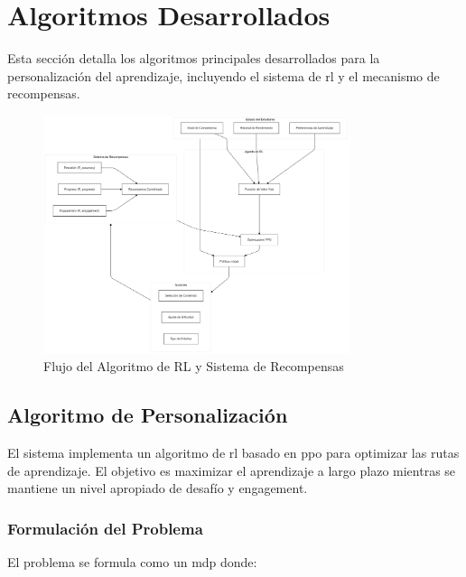\section{Algoritmos Desarrollados}
\label{algoritmos-desarrollados}

Esta sección detalla los algoritmos principales desarrollados para la personalización del aprendizaje, incluyendo el sistema de \gls{rl} y el mecanismo de recompensas.

\begin{figure}[H]
    \caption{Flujo del Algoritmo de RL y Sistema de Recompensas}
    \label{fig:rl-flow}
    \includegraphics[width=0.8\textwidth]{figuras/rl-flow.png}
\end{figure}

\subsection{Algoritmo de Personalización}
\label{algoritmo-personalizacion}

El sistema implementa un algoritmo de \gls{rl} basado en \gls{ppo} \cite{schulman2017proximal} para optimizar las rutas de aprendizaje. El objetivo es maximizar el aprendizaje a largo plazo mientras se mantiene un nivel apropiado de desafío y engagement.

\subsubsection{Formulación del Problema}

El problema se formula como un \gls{mdp} donde:

